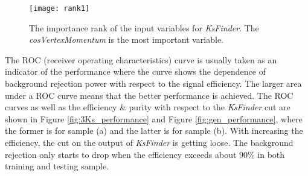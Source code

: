 \begin{figure}[htpb]
	\centering 
	\texttt{[image: rank1]}
	\caption{The importance rank of the input variables for \textit{KsFinder}. The \textit{cosVertexMomentum} is the most important variable.}
	\label{fig:rankks} 
\end{figure}
The ROC (receiver operating characteristics) curve is usually taken as an indicator of the performance where the curve shows the dependence of background rejection power with respect to the signal efficiency. The larger area under a ROC curve means that the better performance is achieved. The ROC curves as well as  the efficiency \& purity with respect to the  \textit{KsFinder} cut are shown in Figure \ref{fig:3Ks_performance}  and Figure  \ref{fig:gen_performance}, where the former is for sample (a) and the latter is for sample (b). With increasing the efficiency, the cut on the output of \textit{KsFinder} is getting loose. The background rejection only starts to drop when the efficiency exceeds about 90\% in both training and testing sample.
\begin{comment}
The importance to the output of \textit{KsFinder} of each variable is obtained from the \textit{KsFinderTest}, where \textit{cosVertexMomentum} has the highest rank, shown in Figure \ref{fig:rankks}. From Figure \ref{fig:3Ks_performance} and \ref{fig:gen_performance}, the purity can exceed 95\% by choosing proper cut value. Instead, by only applying \textit{cosVertexMomentum}$>0.9$ on the cut-based selections, purity can only reach about 80\%, demonstrating the necessity of including more variables to improve the power of classification despite that each variable may only weakly discriminate the true and fake $K_S^0$.
\end{comment}
 


